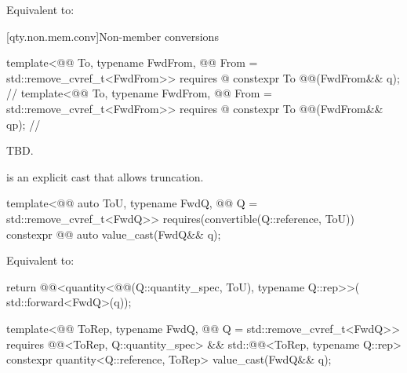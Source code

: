 \begin{itemdescr}
\pnum
\effects
Equivalent to:
\end{itemdescr}

[qty.non.mem.conv]{Non-member conversions}

\begin{itemdecl}
template<@@ To, typename FwdFrom, @@ From = std::remove_cvref_t<FwdFrom>>
  requires @\seebelownc@
constexpr To @@(FwdFrom&& q);  // \expos
template<@@ To, typename FwdFrom, @@ From = std::remove_cvref_t<FwdFrom>>
  requires @\seebelownc@
constexpr To @@(FwdFrom&& qp);  // \expos
\end{itemdecl}

\begin{itemdescr}
\pnum
\returns
TBD.
\end{itemdescr}

\pnum
{} is an explicit cast that allows truncation.

\begin{itemdecl}
template<@@ auto ToU, typename FwdQ, @@ Q = std::remove_cvref_t<FwdQ>>
  requires(convertible(Q::reference, ToU))
constexpr @@ auto value_cast(FwdQ&& q);
\end{itemdecl}

\begin{itemdescr}
\pnum
\effects
Equivalent to:
\begin{codeblock}
return @@<quantity<@@(Q::quantity_spec, ToU), typename Q::rep>>(
  std::forward<FwdQ>(q));
\end{codeblock}
\end{itemdescr}

\begin{itemdecl}
template<@@ ToRep, typename FwdQ, @@ Q = std::remove_cvref_t<FwdQ>>
  requires @@<ToRep, Q::quantity_spec> &&
           std::@@<ToRep, typename Q::rep>
constexpr quantity<Q::reference, ToRep> value_cast(FwdQ&& q);
\end{itemdecl}

